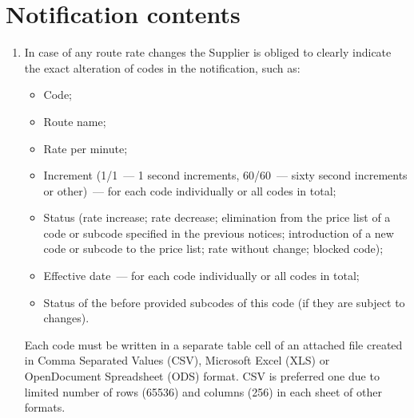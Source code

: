 \begin{Form}
\begin{enumerate}[label=\thesection.\arabic*.]
    \end{enumerate}

  \section{Notification contents}
    
   \begin{enumerate}[label=\thesection.\arabic*.]
    \item In case of any route rate changes the Supplier is obliged to clearly
      indicate the exact alteration of codes in the notification, such as:
    
      \begin{itemize}
      \item Code;
      \item Route name;
      \item Rate per minute;
      \item Increment (1/1~--- 1 second increments, 60/60~--- sixty second increments
        or other)~--- for each code individually or all codes in total;
      \item Status (rate increase; rate decrease; elimination from the price list
        of a code or subcode specified in the previous notices; introduction
        of a new code or subcode to the price list; rate without change; blocked
        code);
      \item Effective date~--- for each code individually or all codes in total;
      \item Status of the before provided subcodes of this code (if they are subject
        to changes).
      \end{itemize}
      

      Each code must be written in a separate table cell of an attached file
      created in Comma Separated Values (CSV), Microsoft Excel (XLS) or
      OpenDocument Spreadsheet (ODS) format. CSV is preferred one due to limited
      number of rows (65536) and columns (256) in each sheet of other formats.


\end{enumerate}
\end{Form}
